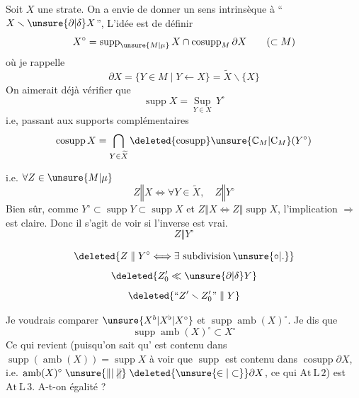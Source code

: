 Soit $X$ une strate. On a envie de donner un sens intrinsèque à ``$X\smallsetminus\unsure{\partial|\delta}X$'', L'idée est de  définir
\[
X^{\circ}=\operatorname{supp}_{\unsure{M|\mu}}X\cap\operatorname{cosupp}_M\partial X\qquad(\subset M)
\]
où je rappelle
\[
\partial X=\{Y\in M\mid Y\leftarrow X\}=\widetilde X\smallsetminus\{X\}
\]
On aimerait déjà vérifier que
\[
\operatorname{supp}X=\underset{Y\in X}{\operatorname{Sup}}\,Y^{\circ}
\]
i.e, passant aux supports complémentaires
\[
\operatorname{cosupp}X=\bigcap_{Y\in\widetilde X}\deleted{\operatorname{cosupp}}\unsure{\mathbb{C}_M|\mathrm{C}_M}(Y^{\circ})
\]

i.e. $\forall Z\in\unsure{M|\mu}$
\[
Z\mathrel{\Vert}X\Longleftrightarrow\forall Y\in\widetilde X,\quad Z\mathrel{\Vert}Y^{\circ}
\]
Bien sûr, comme $Y^{\circ}\subset\operatorname{supp}Y\subset\operatorname{supp}X$ et $Z\mathrel{\Vert}X\Leftrightarrow Z\mathrel{\Vert}\operatorname{supp}X$, l'implication $\Longrightarrow$ est claire. Donc il s'agit de voir si l'inverse est vrai. 
\[
Z\mathrel{\Vert}Y^{\circ}
\]

\[
\deleted{Z\mathrel{\Vert}Y^{\circ}\Longleftrightarrow\exists\text{ subdivision}\,\unsure{\circ|.}}
\]
\[
\deleted{Z'_0\ll\unsure{\partial|\delta}Y}
\]
\[
\deleted{\text{``}Z'\smallsetminus Z'_0\text{''}\mathrel{\Vert}Y}
\]

Je voudrais comparer $\unsure{X^{b}|X^{\flat}|X^{\circ}}$ et $\operatorname{supp}\operatorname{amb}(X)^{\circ}$. Je dis que
\[
\operatorname{supp}\operatorname{amb}(X)^{\circ}\subset X^{\circ}\tag*{(\alpha).}
\]
Ce qui revient (puisqu'on sait  qu'  est contenu dans $\operatorname{supp}(\operatorname{amb}(X))=\operatorname{supp}X$\unsure{,|)} à voir que $\operatorname{supp}$ est contenu dans $\operatorname{cosupp}\partial X$, i.e.  $\operatorname{amb}(X)^{\circ}\mathrel{\unsure{\Vert|\nparallel}}\deleted{\unsure{\in|\subset}}\partial X$, ce qui     $\mathrm{At\ L\,2}$) est $\mathrm{At\ L\,3}$.  A-t-on égalité ?
